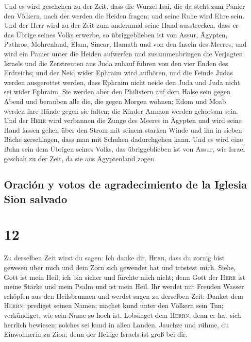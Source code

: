  Und es wird geschehen zu der Zeit, dass die Wurzel Isai,
die da steht zum Panier den Völkern, nach der werden die Heiden fragen;
und seine Ruhe wird Ehre sein.  Und der Herr wird zu der
Zeit zum andernmal seine Hand ausstrecken, dass er das Übrige seines
Volks erwerbe, so übriggeblieben ist von Assur, Ägypten, Pathros,
Mohrenland, Elam, Sinear, Hamath und von den Inseln des Meeres,
 und wird ein Panier unter die Heiden aufwerfen und
zusammenbringen die Verjagten Israels und die Zerstreuten aus Juda
zuhauf führen von den vier Enden des Erdreichs;  und der
Neid wider Ephraim wird aufhören, und die Feinde Judas werden
ausgerottet werden, dass Ephraim nicht neide den Juda und Juda nicht sei
wider Ephraim.  Sie werden aber den Philistern auf dem
Halse sein gegen Abend und berauben alle die, die gegen Morgen wohnen;
Edom und Moab werden ihre Hände gegen sie falten; die Kinder Ammon
werden gehorsam sein.  Und der \textsc{Herr} wird
verbannen die Zunge des Meeres in Ägypten und wird seine Hand lassen
gehen über den Strom mit seinem starken Winde und ihn in sieben Bäche
zerschlagen, dass man mit Schuhen dadurchgehen kann.  Und
es wird eine Bahn sein dem Übrigen seines Volks, das übriggeblieben ist
von Assur, wie Israel geschah zu der Zeit, da sie aus Ägyptenland zogen.

\hypertarget{oraciuxf3n-y-votos-de-agradecimiento-de-la-iglesia-sion-salvado}{%
\subsection{Oración y votos de agradecimiento de la Iglesia Sion
salvado}\label{oraciuxf3n-y-votos-de-agradecimiento-de-la-iglesia-sion-salvado}}

\hypertarget{section-11}{%
\section{12}\label{section-11}}

 Zu derselben Zeit wirst du sagen: Ich danke dir,
\textsc{Herr}, dass du zornig bist gewesen über mich und dein Zorn sich
gewendet hat und tröstest mich.  Siehe, Gott ist mein
Heil, ich bin sicher und fürchte mich nicht; denn Gott der \textsc{Herr}
ist meine Stärke und mein Psalm und ist mein Heil.  Ihr
werdet mit Freuden Wasser schöpfen aus den Heilsbrunnen 
und werdet sagen zu derselben Zeit: Danket dem \textsc{Herrn}; prediget
seinen Namen; machet kund unter den Völkern sein Tun; verkündiget, wie
sein Name so hoch ist.  Lobsinget dem \textsc{Herrn}, denn
er hat sich herrlich bewiesen; solches sei kund in allen Landen.
 Jauchze und rühme, du Einwohnerin zu Zion; denn der
Heilige Israels ist groß bei dir.

